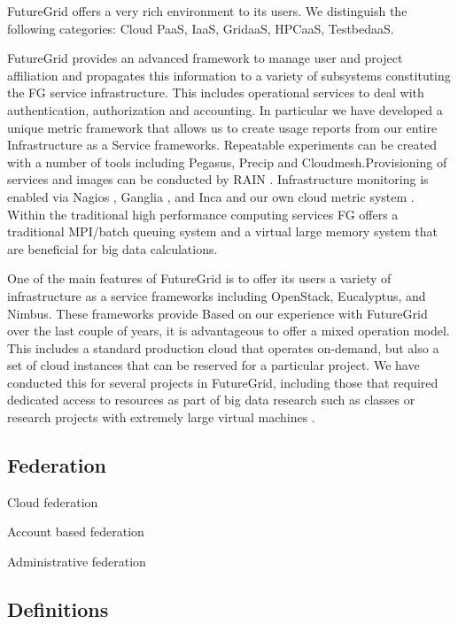 \documentclass{tex/sig-alternate}
\begin{document}
FutureGrid offers a very rich environment to its users. We distinguish the following categories: Cloud PaaS, IaaS, GridaaS, HPCaaS, TestbedaaS.

FutureGrid provides an advanced framework to manage user and project affiliation and propagates this information to a variety of subsystems constituting the FG service infrastructure. This includes operational services to deal with authentication, authorization and accounting. In particular we have developed a unique metric framework that allows us to create usage reports from our entire Infrastructure as a Service frameworks. Repeatable experiments can be created with a number of tools including Pegasus, Precip and Cloudmesh.Provisioning of services and images can be conducted by RAIN \cite{imagemanagement,fg-1295}. Infrastructure monitoring is enabled via Nagios \cite{nagios}, Ganglia \cite{ganglia}, and Inca \cite{inca} and our own cloud metric system \cite{las08federated-cloud}.
Within the traditional high performance computing services FG offers a traditional MPI/batch queuing system and a virtual large memory system that are beneficial for big data calculations.


One of the main features of FutureGrid is to offer its users a variety
of infrastructure as a service frameworks
\cite{comparisoncloud,las2011virt} including OpenStack, Eucalyptus,
and Nimbus. These frameworks provide Based on our experience
with FutureGrid over the last couple of years, it is advantageous to
offer a mixed operation model. This includes a standard production
cloud that operates on-demand, but also a set of cloud instances that
can be reserved for a particular project. We have conducted this for
several projects in FutureGrid, including those that required
dedicated access to resources as part of big data research such as
classes \cite{fg405,fg368} or research projects with extremely large
virtual machines \cite{fg298}.


\subsection{Federation}

Cloud federation

Account based federation

Administrative federation


\cite{kurze2011cloudfederation}
\cite{phantom12}

\subsection{Definitions}
\end{document}

